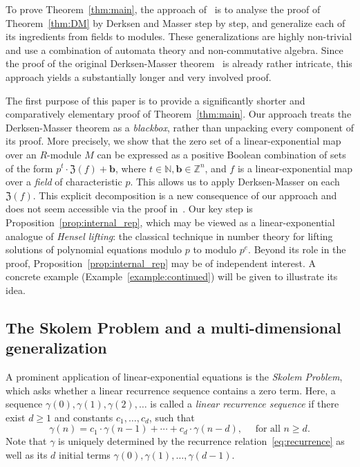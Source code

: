 \documentclass[letterpaper, 11pt, thm-restate]{article}
\numberwithin{equation}{section}
\newcommand{\Z}{\mathbb{Z}}
\newcommand{\N}{\mathbb{N}}
\newcommand{\mZ}{\mathfrak{Z}}
\newcommand{\bb}{\boldsymbol{b}}
\theoremstyle{definition}
\theoremstyle{definition}
\theoremstyle{definition}
\begin{document}
To prove Theorem~\ref{thm:main}, the approach of~\cite{dong2025s} is to analyse the proof of Theorem~\ref{thm:DM} by Derksen and Masser step by step, and generalize each of its ingredients from fields to modules. 
These generalizations are highly non-trivial and use a combination of automata theory and non-commutative algebra.
Since the proof of the original Derksen-Masser theorem~\cite{derksen2012linear} is already rather intricate, this approach yields a substantially longer and very involved proof.

The first purpose of this paper is to provide a significantly shorter and comparatively elementary proof of Theorem~\ref{thm:main}.
Our approach treats the Derksen-Masser theorem as a \emph{blackbox}, rather than unpacking every component of its proof.
More precisely, we show that the zero set of a linear-exponential map over an $R$-module $M$ can be expressed as a positive Boolean combination of sets of the form $p^t \cdot \mZ(f) + \bb$, where $t \in \N, \bb \in \Z^n$, and $f$ is a linear-exponential map over a \emph{field} of characteristic $p$.
This allows us to apply Derksen-Masser on each $\mZ(f)$.
This explicit decomposition is a new consequence of our approach and does not seem accessible via the proof in~\cite{dong2025s}.
Our key step is Proposition~\ref{prop:internal_rep}, which may be viewed as a linear-exponential analogue of \emph{Hensel lifting}: the classical technique in number theory for lifting solutions of polynomial equations modulo $p$ to modulo $p^e$. 
Beyond its role in the proof, Proposition~\ref{prop:internal_rep} may be of independent interest.
A concrete example (Example~\ref{example:continued}) will be given to illustrate its idea.

\subsection{The Skolem Problem and a multi-dimensional generalization}\label{subsec:intro_Skolem}

A prominent application of linear-exponential equations is the \emph{Skolem Problem}, which asks whether a linear recurrence sequence contains a zero term.
Here, a sequence $\gamma(0), \gamma(1), \gamma(2), \ldots$ is called a \emph{linear recurrence sequence} if there exist $d \geq 1$ and constants $c_1, \ldots, c_{d}$, such that
\begin{equation}\label{eq:recurrence}
    \gamma(n) = c_1 \cdot \gamma(n-1) + \cdots + c_d \cdot \gamma(n-d), \quad \text{ for all } n \geq d.
\end{equation}
Note that $\gamma$ is uniquely determined by the recurrence relation~\eqref{eq:recurrence} as well as its $d$ initial terms $\gamma(0), \gamma(1), \ldots, \gamma(d-1)$.
\end{document}
